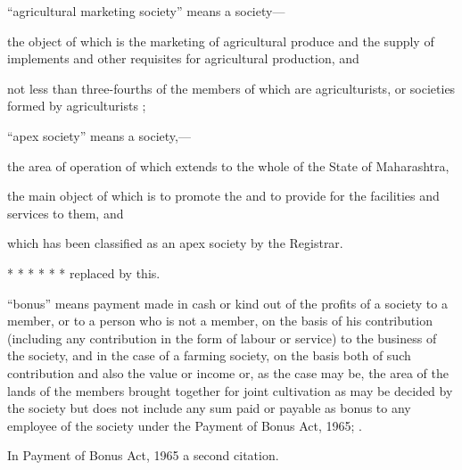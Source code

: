 \documentclass[reprint]{mhact}
\begin{document}
      \begin{subsectionlist}
         ``agricultural marketing society'' means a
        society---

        \begin{clause}

         the object of which is the marketing of
        agricultural produce and the supply of implements and other
        requisites for agricultural production, and

         not less than
        three-fourths of the members of which are agriculturists, or
        societies formed by agriculturists ;
      \end{clause}
      
            ``apex society'' means a society,--- 


      \begin{clause}
         the area of operation of which extends
        to the whole of the State of Maharashtra,

         the main object of which is to promote the
        and to provide for the facilities and services to them, and

         which has been classified as an
        apex society by the Registrar.
      \end{clause}

      

       *  * * * * * replaced by this.

    ``bonus'' means payment made in cash or kind out of
      the profits of a society to a member, or to a person who is not
      a member, on the basis of his contribution (including any
      contribution in the form of labour or service) to the business
      of the society, and in the case of a farming society, on the
      basis both of such contribution and also the value or income or,
      as the case may be, the area of the lands of the members brought
      together for joint cultivation as may be decided by the society
      but does not include any sum paid or payable as bonus to any
      employee of the society under the Payment of Bonus Act,
      1965;%
      .

       In Payment of Bonus Act, 1965 a second
      citation.
    \end{subsectionlist} 
\end{document}
